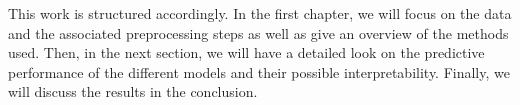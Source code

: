 This work is structured accordingly. In the first chapter, we will focus on the data and the associated preprocessing steps as well as give an overview of the methods used. Then, in the next section, we will have a detailed look on the predictive performance of the different models and their possible interpretability. Finally, we will discuss the results in the conclusion.

























